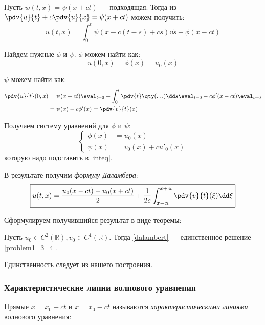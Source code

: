 Пусть $w(t, x) = \psi(x + ct)$ --- подходящая. Тогда из $\pdv{u}{t} + c \pdv{u}{x} = \psi(x + ct)$ можем получить:
\begin{equation}
  u(t, x) = \int_0^t \psi(x - c(t-s) + cs) \dd s + \phi(x - ct) \label{inteq}
\end{equation}

Найдем нужные $\phi$ и $\psi$. $\phi$ можем найти как:
\begin{equation}
  u(0, x) = \phi(x) = u_0(x)
\end{equation}

$\psi$ можем найти как:
\begin{equation}
  \begin{aligned}
    \pdv{u}{t} (0, x)
    &= \psi(x + ct) \eval_{t = 0} + \int_0^t \pdv{t} \qty(\ldots) \dd s \eval_{t = 0} - c \phi' (x - ct) \eval_{t = 0} \\
    &= \psi(x) - c \phi'(x) = \pdv{v}{t} (x)
  \end{aligned}
\end{equation}

Получаем систему уравнений для $\phi$ и $\psi$:
\begin{equation}
  \left\{\begin{aligned}
    \phi(x) &= u_0(x) \\
    \psi(x) &= v_0(x) + cu'_0(x)
  \end{aligned}\right.
\end{equation}
которую надо подставить в \eqref{inteq}.

В результате получим \emph{формулу Даламбера}:
\begin{equation}
  \boxed{u(t, x) = \frac{u_0(x - ct) + u_0(x + ct)}{2} + \frac{1}{2c} \int_{x-ct}^{x+ct} \pdv{v}{t}(\xi) \dd \xi} \label{dalambert}
\end{equation}

Сформулируем получившийся результат в виде теоремы:
\begin{thm}
  Пусть $u_0 \in C^2(\mathbb{R}), v_0 \in C^1(\mathbb{R})$. Тогда \eqref{dalambert} --- единственное решение \eqref{problem1_3_4}.
\end{thm}

Единственность следует из нашего построения.

\subsubsection{Характеристические линии волнового уравнения}

Прямые $x = x_0 + ct$ и $x = x_0 - ct$ называются \emph{характеристическими линиями} волнового уравнения:

